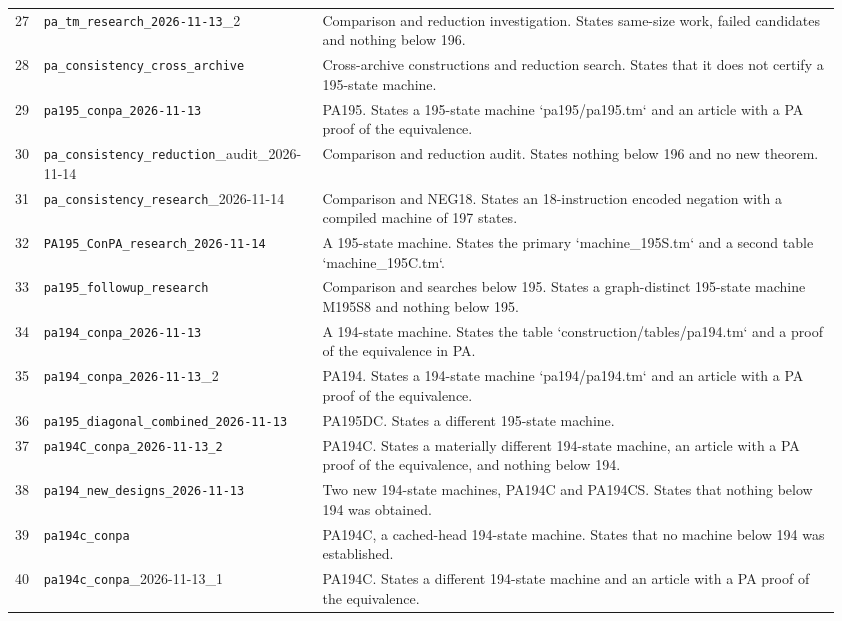 \begin{longtable}{p{0.035\linewidth}p{0.31\linewidth}p{0.61\linewidth}}
27 & \nolinkurl{pa_tm_research_2026-11-13}\_2 & Comparison and reduction investigation. States same-size work, failed candidates and nothing below 196.\\[4pt]
28 & \nolinkurl{pa_consistency_cross_archive} & Cross-archive constructions and reduction search. States that it does not certify a 195-state machine.\\[4pt]
29 & \nolinkurl{pa195_conpa_2026-11-13} & PA195. States a 195-state machine `pa195/pa195.tm` and an article with a PA proof of the equivalence.\\[4pt]
30 & \nolinkurl{pa_consistency_reduction}\_audit\_2026-11-14 & Comparison and reduction audit. States nothing below 196 and no new theorem.\\[4pt]
31 & \nolinkurl{pa_consistency_research}\_2026-11-14 & Comparison and NEG18. States an 18-instruction encoded negation with a compiled machine of 197 states.\\[4pt]
32 & \nolinkurl{PA195_ConPA_research_2026-11-14} & A 195-state machine. States the primary `machine\_195S.tm` and a second table `machine\_195C.tm`.\\[4pt]
33 & \nolinkurl{pa195_followup_research} & Comparison and searches below 195. States a graph-distinct 195-state machine M195S8 and nothing below 195.\\[4pt]
34 & \nolinkurl{pa194_conpa_2026-11-13} & A 194-state machine. States the table `construction/tables/pa194.tm` and a proof of the equivalence in PA.\\[4pt]
35 & \nolinkurl{pa194_conpa_2026-11-13}\_2 & PA194. States a 194-state machine `pa194/pa194.tm` and an article with a PA proof of the equivalence.\\[4pt]
36 & \nolinkurl{pa195_diagonal_combined_2026-11-13} & PA195DC. States a different 195-state machine.\\[4pt]
37 & \nolinkurl{pa194C_conpa_2026-11-13_2} & PA194C. States a materially different 194-state machine, an article with a PA proof of the equivalence, and nothing below 194.\\[4pt]
38 & \nolinkurl{pa194_new_designs_2026-11-13} & Two new 194-state machines, PA194C and PA194CS. States that nothing below 194 was obtained.\\[4pt]
39 & \nolinkurl{pa194c_conpa} & PA194C, a cached-head 194-state machine. States that no machine below 194 was established.\\[4pt]
40 & \nolinkurl{pa194c_conpa}\_2026-11-13\_1 & PA194C. States a different 194-state machine and an article with a PA proof of the equivalence.\\[4pt]

\end{longtable}

